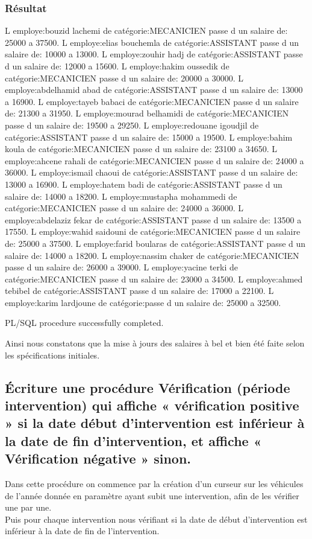 \documentclass[•]{article}
\begin{document}
\subsubsection{Résultat}
\begin{sql}
L employe:bouzid lachemi de catégorie:MECANICIEN passe d un salaire de: 25000 a 37500.
L employe:elias bouchemla de catégorie:ASSISTANT passe d un salaire de: 10000 a 13000.
L employe:zouhir hadj de catégorie:ASSISTANT passe d un salaire de: 12000 a 15600.
L employe:hakim oussedik de catégorie:MECANICIEN passe d un salaire de: 20000 a 30000.
L employe:abdelhamid abad de catégorie:ASSISTANT passe d un salaire de: 13000 a 16900.
L employe:tayeb babaci de catégorie:MECANICIEN passe d un salaire de: 21300 a 31950.
L employe:mourad belhamidi de catégorie:MECANICIEN passe d un salaire de: 19500 a 29250.
L employe:redouane igoudjil de catégorie:ASSISTANT passe d un salaire de: 15000 a 19500.
L employe:bahim koula de catégorie:MECANICIEN passe d un salaire de: 23100 a 34650.
L employe:ahcene rahali de catégorie:MECANICIEN passe d un salaire de: 24000 a 36000.
L employe:ismail chaoui de catégorie:ASSISTANT passe d un salaire de: 13000 a 16900.
L employe:hatem badi de catégorie:ASSISTANT passe d un salaire de: 14000 a 18200.
L employe:mustapha mohammedi de catégorie:MECANICIEN passe d un salaire de: 24000 a 36000.
L employe:abdelaziz fekar de catégorie:ASSISTANT passe d un salaire de: 13500 a 17550.
L employe:wahid saidouni de catégorie:MECANICIEN passe d un salaire de: 25000 a 37500.
L employe:farid boularas de catégorie:ASSISTANT passe d un salaire de: 14000 a 18200.
L employe:nassim chaker de catégorie:MECANICIEN passe d un salaire de: 26000 a 39000.
L employe:yacine terki de catégorie:MECANICIEN passe d un salaire de: 23000 a 34500.
L employe:ahmed tebibel de catégorie:ASSISTANT passe d un salaire de: 17000 a 22100.
L employe:karim lardjoune de catégorie:passe d un salaire de: 25000 a 32500.

PL/SQL procedure successfully completed.
\end{sql}
Ainsi nous constatons que la mise à jours des salaires à bel et bien été faite selon les spécifications initiales.


\subsection{Écriture une procédure Vérification (période intervention) qui affiche « vérification positive » si la date début d'intervention est inférieur à la date de fin d'intervention, et affiche « Vérification négative » sinon.}
Dans cette procédure on commence par la création d'un curseur sur les véhicules de l'année donnée en paramètre ayant subit une intervention, afin de les vérifier une par une.  \\
Puis pour chaque intervention nous vérifiant si la date de début d'intervention est inférieur à la date de fin de l'intervention.
\end{document}
